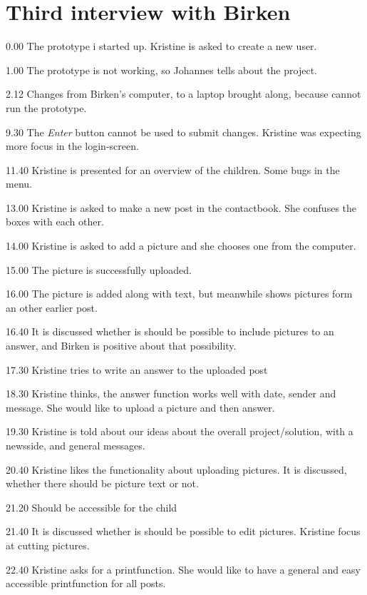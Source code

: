 \section*{Third interview with Birken}
\label{third_interview}

0.00
The prototype i started up.
Kristine is asked to create a new user.

1.00
The prototype is not working, so Johannes tells about the project.

2.12
Changes from Birken's computer, to a laptop brought along, because  cannot run the prototype.

9.30
The \textit{Enter} button cannot be used to submit changes. Kristine was expecting more focus in the login-screen.

11.40
Kristine is presented for an overview of the children.
Some bugs in the menu.

13.00
Kristine is asked to make a new post in the contactbook. She confuses the boxes with each other.

14.00
Kristine is asked to add a picture and she chooses one from the computer.

15.00
The picture is successfully uploaded.

16.00
The picture is added along with text, but meanwhile shows pictures form an other earlier post.

16.40
It is discussed whether is should be possible to include pictures to an answer, and Birken is positive about that possibility.

17.30
Kristine tries to write an answer to the uploaded post

18.30
Kristine thinks, the answer function works well with date, sender and message. She would like to upload a picture and then answer.

19.30
Kristine is told about our ideas about the overall project/solution, with a newsside, and general messages.

20.40
Kristine likes the functionality about uploading pictures.
It is discussed, whether there should be picture text or not.

21.20
Should be accessible for the child 

21.40
It is discussed whether is should be possible to edit pictures. Kristine focus at cutting pictures.

22.40
Kristine asks for a printfunction. She would like to have a general and easy accessible printfunction for all posts.


